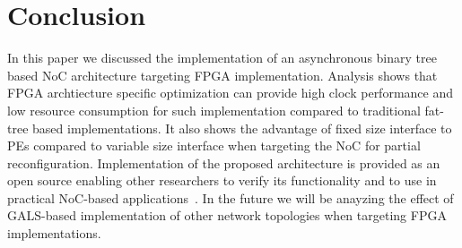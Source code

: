\section{Conclusion}
\label{sec:conclusion}
In this paper we discussed the implementation of an asynchronous binary tree based NoC architecture targeting FPGA implementation.
Analysis shows that FPGA archtiecture specific optimization can provide high clock performance and low resource consumption for such implementation compared to traditional fat-tree based implementations.
It also shows the advantage of fixed size interface to PEs compared to variable size interface when targeting the NoC for partial reconfiguration.
Implementation of the proposed architecture is provided as an open source enabling other researchers to verify its functionality and to use in practical NoC-based applications~\cite{hnoc}.
In the future we will be anayzing the effect of GALS-based implementation of other network topologies when targeting FPGA implementations.
